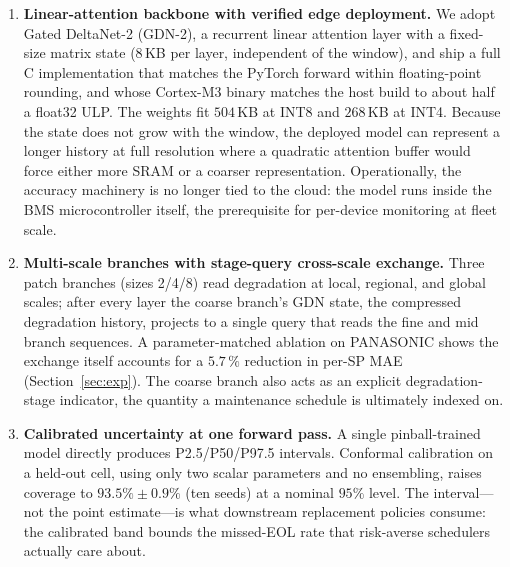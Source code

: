 \begin{enumerate}
\item \textbf{Linear-attention backbone with verified edge
deployment.} We adopt Gated DeltaNet-2 (GDN-2), a recurrent linear
attention layer with a fixed-size matrix state ($8$\,KB per layer,
independent of the window), and ship a full C
implementation that matches the PyTorch forward within
floating-point rounding, and whose Cortex-M3 binary matches the host
build to about half a float32 ULP. The weights fit $504$\,KB at INT8
and $268$\,KB at INT4. Because the state
does not grow with the window, the deployed model can represent a
longer history at full resolution where a quadratic attention buffer
would force either more SRAM or a coarser representation.
Operationally, the accuracy machinery is no longer tied to the
cloud: the model runs inside the BMS microcontroller itself, the
prerequisite for per-device monitoring at fleet scale.

\item \textbf{Multi-scale branches with stage-query cross-scale
exchange.} Three patch branches (sizes 2/4/8) read degradation at
local, regional, and global scales; after every layer the coarse
branch's GDN state, the compressed degradation history, projects to
a single query that reads the fine and mid branch sequences.
A parameter-matched ablation on PANASONIC shows the exchange itself
accounts for a $5.7\,\%$ reduction in per-SP MAE
(Section~\ref{sec:exp}). The coarse
branch also
acts as an explicit degradation-stage indicator, the quantity a
maintenance schedule is ultimately indexed on.

\item \textbf{Calibrated uncertainty at one forward pass.} A single pinball-trained model
directly produces P2.5/P50/P97.5 intervals. Conformal calibration on a held-out cell,
using only two scalar parameters and no ensembling, raises coverage to $93.5\%\pm0.9\%$ (ten seeds)
at a nominal $95\%$ level. The interval---not the point estimate---is
what downstream replacement policies consume: the calibrated band bounds the missed-EOL rate
that risk-averse schedulers actually care about.


\end{enumerate}
